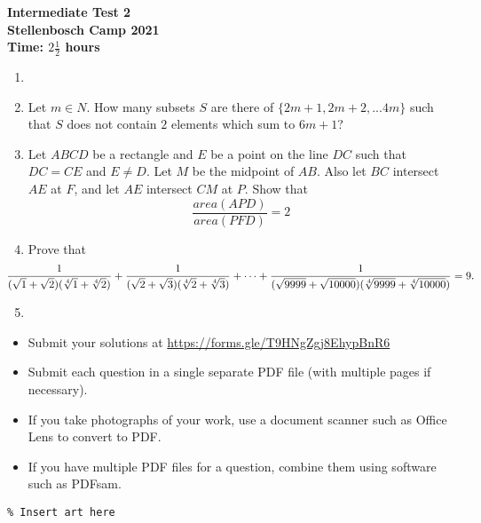 \documentclass{article}
\begin{document}
\thispagestyle{empty}

\begin{center}
  \textbf{\Large Intermediate Test 2}
  \\ \vspace{1em}
  \textbf{\large Stellenbosch Camp 2021}
  \\ \vspace{1em}
  \textbf{\large Time: $2\frac{1}{2}$ hours}
\end{center}

\bigskip

\begin{enumerate}[itemsep=\fill]


\item %


\item %
Let $m \in {N}$. How many subsets $S$ are there of $\{2m+1,2m+2,...4m\}$ such that $S$ does not contain $2$ elements which sum to $6m+1$? 

\item %
Let $ABCD$ be a rectangle and $E$ be a point on the line $DC$ such that $DC = CE$ and $E \neq D$.  Let $M$ be the midpoint of $AB$.  Also let $BC$ intersect $AE$ at $F$, and let $AE$ intersect $CM$ at $P$.  Show that $$\frac{area(APD)}{area(PFD)} = 2$$

\item %
Prove that
\[ \mspace{-36mu} \frac{1}{(\sqrt{1}+\sqrt{2})(\sqrt[4]{1}+\sqrt[4]{2})} +\frac{1}{(\sqrt{2}+\sqrt{3})(\sqrt[4]{2}+\sqrt[4]{3})} +\dotsb +\frac{1}{(\sqrt{9999}+\sqrt{10000})(\sqrt[4]{9999}+\sqrt[4]{10000})} = 9. \]


\item %

\end{enumerate}


\vfill
\begin{itemize}
	\item Submit your solutions at \href{https://forms.gle/T9HNgZgj8EhypBnR6}{https://forms.gle/T9HNgZgj8EhypBnR6}
	\item Submit each question in a single separate PDF file (with multiple pages if necessary).
	\item If you take photographs of your work, use a document scanner such as Office Lens to convert to PDF.
	\item If you have multiple PDF files for a question, combine them using software such as PDFsam.
\end{itemize}

\vfill
\centering
\begin{BVerbatim}
\end{BVerbatim}
\end{document}
